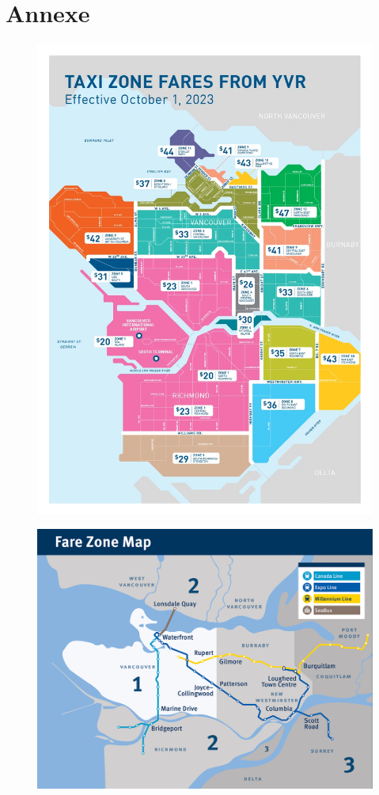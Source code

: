 \documentclass{article}
\begin{document}
\section{Annexe}
\begin{figure}[h]
    \centering
    \includegraphics[scale=0.3]{carte_taxis_Vancouver.png}
    \caption{}
\end{figure}

\begin{figure}[h]
    \centering
    \includegraphics[scale=0.3]{vancouver_sections.png}
    \caption{}
\end{figure}
\end{document}
